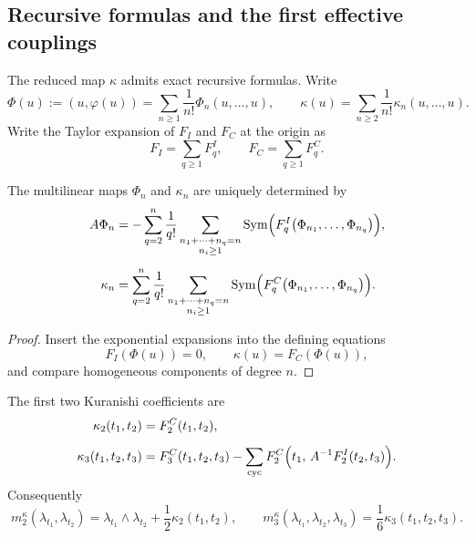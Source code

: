 \subsection{Recursive formulas and the first effective couplings}

The reduced map $\kappa$ admits exact recursive formulas. Write
\[
\Phi(u):=(u,\varphi(u))=\sum_{n\ge 1}\frac{1}{n!}\Phi_n(u,\dots,u),
\qquad
\kappa(u)=\sum_{n\ge 2}\frac{1}{n!}\kappa_n(u,\dots,u).
\]
Write the Taylor expansion of $F_I$ and $F_C$ at the origin as
\[
F_I=\sum_{q\ge 1}F_q^I,
\qquad
F_C=\sum_{q\ge 1}F_q^C.
\]

\begin{proposition}\label{prop:recursive-kuranishi}
The multilinear maps $\Phi_n$ and $\kappa_n$ are uniquely determined by
\begin{align}
A\Phi_n
&=
-
\sum_{q=2}^{n}
\frac{1}{q!}
\sum_{\substack{n_1+\cdots+n_q=n\\ n_i\ge 1}}
\operatorname{Sym}\Bigl(F_q^I\bigl(\Phi_{n_1},\dots,\Phi_{n_q}\bigr)\Bigr),
\label{eq:phi-recursion}
\\[0.5em]
\kappa_n
&=
\sum_{q=2}^{n}
\frac{1}{q!}
\sum_{\substack{n_1+\cdots+n_q=n\\ n_i\ge 1}}
\operatorname{Sym}\Bigl(F_q^C\bigl(\Phi_{n_1},\dots,\Phi_{n_q}\bigr)\Bigr).
\label{eq:kappa-recursion}
\end{align}
\end{proposition}

\begin{proof}
Insert the exponential expansions into the defining equations
\[
F_I(\Phi(u))=0,
\qquad
\kappa(u)=F_C(\Phi(u)),
\]
and compare homogeneous components of degree $n$.
\end{proof}

\begin{corollary}\label{cor:low-order-kappa}
The first two Kuranishi coefficients are
\begin{align}
\kappa_2(t_1,t_2)
&=
F_2^C(t_1,t_2),
\label{eq:kappa2}
\\[0.5em]
\kappa_3(t_1,t_2,t_3)
&=
F_3^C(t_1,t_2,t_3)
-
\sum_{\mathrm{cyc}}
F_2^C\Bigl(t_1,\,A^{-1}F_2^I(t_2,t_3)\Bigr).
\label{eq:kappa3}
\end{align}
Consequently
\[
m_2^\kappa(\lambda_{t_1},\lambda_{t_2})
=
\lambda_{t_1}\wedge \lambda_{t_2}
+\frac{1}{2}\kappa_2(t_1,t_2),
\qquad
m_3^\kappa(\lambda_{t_1},\lambda_{t_2},\lambda_{t_3})
=
\frac{1}{6}\kappa_3(t_1,t_2,t_3).
\]
\end{corollary}

